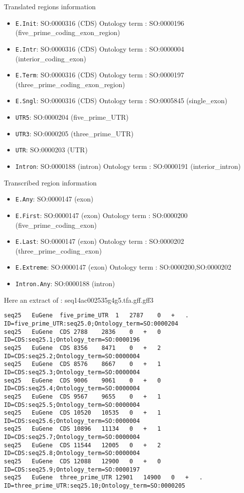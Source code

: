 Translated regions information
\begin{itemize}
\item \texttt{E.Init}: SO:0000316 (CDS) Ontology term :	SO:0000196 (five\_prime\_coding\_exon\_region)
\item \texttt{E.Intr}: SO:0000316 (CDS) Ontology term :	SO:0000004 (interior\_coding\_exon)
\item \texttt{E.Term}: SO:0000316 (CDS) Ontology term :	SO:0000197 (three\_prime\_coding\_exon\_region)
\item \texttt{E.Sngl}: SO:0000316 (CDS) Ontology term :	SO:0005845 (single\_exon)
\item \texttt{UTR5}:   SO:0000204 (five\_prime\_UTR)
\item \texttt{UTR3}:   SO:0000205 (three\_prime\_UTR)
\item \texttt{UTR}:    SO:0000203 (UTR)
\item \texttt{Intron}: SO:0000188 (intron) Ontology term : SO:0000191	(interior\_intron)
\end{itemize}

Transcribed region information
\begin{itemize}
\item \texttt{E.Any}: 		SO:0000147 (exon)
\item \texttt{E.First}: 	SO:0000147 (exon)	Ontology term :	SO:0000200 (five\_prime\_coding\_exon)
\item \texttt{E.Last}: 		SO:0000147 (exon)	Ontology term :	SO:0000202 (three\_prime\_coding\_exon)
\item \texttt{E.Extreme}: 	SO:0000147 (exon)	Ontology term :	SO:0000200,SO:0000202
\item \texttt{Intron.Any}: 	SO:0000188 (intron)
\end{itemize}

Here an extract of : seq14ac002535g4g5.tfa.gff.gff3
\begin{Verbatim}[fontsize=\tiny]
seq25	EuGene	five_prime_UTR	1	2787	0	+	.	ID=five_prime_UTR:seq25.0;Ontology_term=SO:0000204
seq25	EuGene	CDS	2788	2836	0	+	0	ID=CDS:seq25.1;Ontology_term=SO:0000196
seq25	EuGene	CDS	8356	8471	0	+	2	ID=CDS:seq25.2;Ontology_term=SO:0000004
seq25	EuGene	CDS	8576	8667	0	+	1	ID=CDS:seq25.3;Ontology_term=SO:0000004
seq25	EuGene	CDS	9006	9061	0	+	0	ID=CDS:seq25.4;Ontology_term=SO:0000004
seq25	EuGene	CDS	9567	9655	0	+	1	ID=CDS:seq25.5;Ontology_term=SO:0000004
seq25	EuGene	CDS	10520	10535	0	+	1	ID=CDS:seq25.6;Ontology_term=SO:0000004
seq25	EuGene	CDS	10896	11134	0	+	1	ID=CDS:seq25.7;Ontology_term=SO:0000004
seq25	EuGene	CDS	11544	12005	0	+	2	ID=CDS:seq25.8;Ontology_term=SO:0000004
seq25	EuGene	CDS	12088	12900	0	+	0	ID=CDS:seq25.9;Ontology_term=SO:0000197
seq25	EuGene	three_prime_UTR	12901	14900	0	+	.	ID=three_prime_UTR:seq25.10;Ontology_term=SO:0000205
\end{Verbatim}

